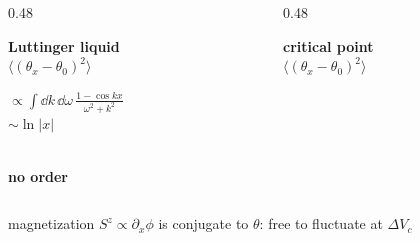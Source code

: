 \begin{frame}[t]
\par
\vspace{1.2cm}
\begin{columns}[T]
\begin{column}{0.48\textwidth}
\centering
\colorbox{cLL!20}{\parbox{4.75cm}{\centering\footnotesize
 \textbf{Luttinger liquid}\\[3pt]
 $\langle(\theta_x-\theta_0)^2\rangle$\\[1pt]
 \parbox[c][1.0cm][c]{\linewidth}{\centering
 $\displaystyle\propto\int\!\dd k\,\dd\omega\,\frac{1-\cos kx}{\omega^2+k^2}$\\[2pt]
 $\displaystyle\sim\ln|x|$}\\[2pt]
 \textbf{no order}\mystrut}}
\end{column}
\begin{column}{0.48\textwidth}
\centering
\colorbox{cQCP!15}{\parbox{4.75cm}{\centering\footnotesize
 \textbf{critical point}\\[3pt]
 $\langle(\theta_x-\theta_0)^2\rangle$\\[1pt]
 \parbox[c][1.0cm][c]{\linewidth}{\centering
 }\\[2pt]
 \mystrut}}
\end{column}
\end{columns}
\vspace{0.9cm}
\centering
{\footnotesize magnetization $S^z\propto\partial_x\phi$ is conjugate to $\theta$: free to fluctuate at $\Delta V_c$\par}
\end{frame}

